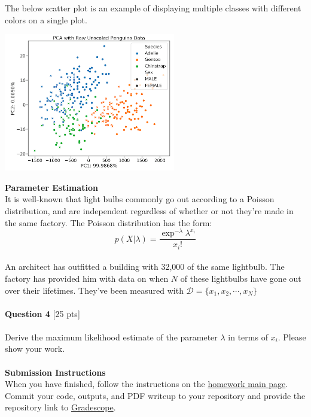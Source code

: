 \documentclass[paper=a4, fontsize=11pt]{scrartcl} %
\begin{document}
The below scatter plot is an example of displaying multiple classes with different colors on a single plot.

\begin{center}
    \includegraphics[width=75mm]{images/pca-example.png}
\end{center}

{\huge \textbf{Parameter Estimation}} \\





It is well-known that light bulbs commonly go out according to a Poisson distribution, and are independent regardless of whether or not they're made in the same factory. The Poisson distribution has the form: \\
\begin{equation}
p(X | \lambda) = \frac{ \exp^{-\lambda} \lambda ^{x_i}}{ x_i !} \nonumber
\end{equation} \\

An architect has outfitted a building with 32,000 of the same lightbulb. The factory has provided him with data on when $N$ of these lightbulbs have gone out over their lifetimes. They've been measured with $\mathcal{D} = \{ x_1, x_2, \cdots, x_N \}$\\
\\
{\Large \textbf{Question 4} [25 pts]} \\
\\
Derive the maximum likelihood estimate of the parameter $\lambda$ in terms of $x_i$. Please show your work. \\
\\


{\huge \textbf{Submission Instructions}} \\

When you have finished, follow the instructions on the \href{https://course.ccs.neu.edu/cs6220/homework-3/}{ homework main page}. Commit your code, outputs, and PDF writeup to your repository and provide the repository link to \href{https://www.gradescope.com}{Gradescope}.
\end{document}
